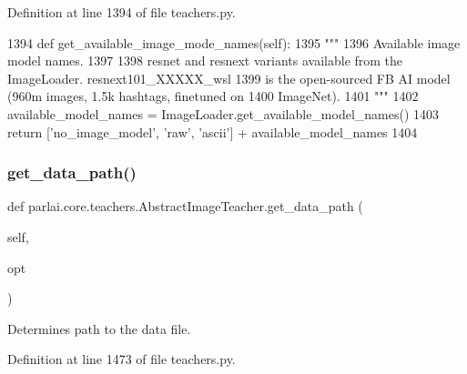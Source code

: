 Definition at line 1394 of file teachers.\+py.


\begin{DoxyCode}
1394     \textcolor{keyword}{def }get\_available\_image\_mode\_names(self):
1395         \textcolor{stringliteral}{"""}
1396 \textcolor{stringliteral}{        Available image model names.}
1397 \textcolor{stringliteral}{}
1398 \textcolor{stringliteral}{        resnet and resnext variants available from the ImageLoader. resnext101\_XXXXX\_wsl}
1399 \textcolor{stringliteral}{        is the open-sourced FB AI model (960m images, 1.5k hashtags, finetuned on}
1400 \textcolor{stringliteral}{        ImageNet).}
1401 \textcolor{stringliteral}{        """}
1402         available\_model\_names = ImageLoader.get\_available\_model\_names()
1403         \textcolor{keywordflow}{return} [\textcolor{stringliteral}{'no\_image\_model'}, \textcolor{stringliteral}{'raw'}, \textcolor{stringliteral}{'ascii'}] + available\_model\_names
1404 
\end{DoxyCode}
\mbox{\label{classparlai_1_1core_1_1teachers_1_1AbstractImageTeacher_aa3c1da773025838ffa03b47c3fc21c7e}} 
\subsubsection{\texorpdfstring{get\+\_\+data\+\_\+path()}{get\_data\_path()}}
{\footnotesize\ttfamily def parlai.\+core.\+teachers.\+Abstract\+Image\+Teacher.\+get\+\_\+data\+\_\+path (\begin{DoxyParamCaption}\item[{}]{self,  }\item[{}]{opt }\end{DoxyParamCaption})}

\begin{DoxyVerb}Determines path to the data file.
\end{DoxyVerb}
 

Definition at line 1473 of file teachers.\+py.


